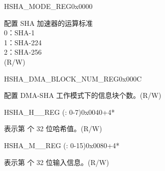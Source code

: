 \begin{register}{H}{SHA\_MODE\_REG}{0x0000}\label{regdesc:SHAMODEREG}
%
%
\regnewline%
\begin{regdesc}\begin{reglist}
\label{fielddesc:SHAMODE}\item [SHA\_MODE] 配置 SHA 加速器的运算标准\\
0：SHA-1\\
1：SHA-224\\
2：SHA-256\\
(R/W)
\end{reglist}\end{regdesc}
\end{register}



\begin{register}{H}{SHA\_DMA\_BLOCK\_NUM\_REG}{0x000C}\label{regdesc:SHADMABLOCKNUMREG}
%
%
\regnewline%
\begin{regdesc}\begin{reglist}
\label{fielddesc:SHADMABLOCKNUM}\item [SHA\_DMA\_BLOCK\_NUM] 配置 DMA-SHA 工作模式下的信息块个数。(R/W)
\end{reglist}\end{regdesc}
\end{register}

\begin{register}{H}{SHA\_H\_\_REG (: 0-7)}{0x0040+4*}\label{regdesc:SHAHNREG}
%
\regnewline%
\begin{regdesc}\begin{reglist}
\label{fielddesc:SHAH0}\item [SHA\_H\_\regindex{n}] 表示第  个 32 位哈希值。(R/W)
\end{reglist}\end{regdesc}
\end{register}


\begin{register}{H}{SHA\_M\_\_REG (: 0-15)}{0x0080+4*}\label{regdesc:SHAMNREG}
%
\begin{regdesc}\begin{reglist}
\label{fielddesc:SHAM0}\item [SHA\_M\_\regindex{n}] 表示第  个 32 位输入信息。(R/W)
\end{reglist}\end{regdesc}
\end{register}
